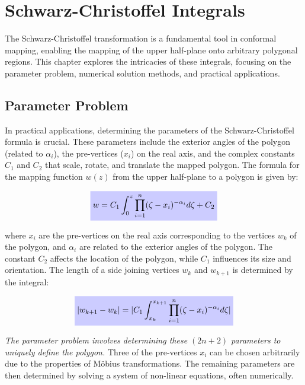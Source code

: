 \documentclass[12pt, a4paper]{report}
\newcommand{\highlight}[2]{\colorbox{#1!20}{$\displaystyle #2$}}
\newcommand{\impformula}[1]{\highlight{blue}{#1}}
\newcommand{\imppoint}[1]{\colorbox{green!10}{\textit{#1}}}
\begin{document}
\chapter{Schwarz-Christoffel Integrals}

The Schwarz-Christoffel transformation is a fundamental tool in conformal mapping, enabling the mapping of the upper half-plane onto arbitrary polygonal regions. This chapter explores the intricacies of these integrals, focusing on the parameter problem, numerical solution methods, and practical applications.

\section{Parameter Problem}

In practical applications, determining the parameters of the Schwarz-Christoffel formula is crucial. These parameters include the exterior angles of the polygon (related to $\alpha_i$), the pre-vertices ($x_i$) on the real axis, and the complex constants $C_1$ and $C_2$ that scale, rotate, and translate the mapped polygon. The formula for the mapping function $w(z)$ from the upper half-plane to a polygon is given by:

\begin{equation}
    \impformula{w = C_1 \int_0^z \prod_{i=1}^n (\zeta - x_i)^{-\alpha_i} d\zeta + C_2} \label{eq:SC_formula}
\end{equation}

where $x_i$ are the pre-vertices on the real axis corresponding to the vertices $w_k$ of the polygon, and $\alpha_i$ are related to the exterior angles of the polygon. The constant $C_2$ affects the location of the polygon, while $C_1$ influences its size and orientation. The length of a side joining vertices $w_k$ and $w_{k+1}$ is determined by the integral:

\begin{equation}
    \impformula{|w_{k+1} - w_k| = |C_1 \int_{x_k}^{x_{k+1}} \prod_{i=1}^n (\zeta - x_i)^{-\alpha_i} d\zeta|} \label{eq:side_length}
\end{equation}

\imppoint{The parameter problem involves determining these $(2n+2)$ parameters to uniquely define the polygon.} Three of the pre-vertices $x_i$ can be chosen arbitrarily due to the properties of Möbius transformations. The remaining parameters are then determined by solving a system of non-linear equations, often numerically.
\end{document}
